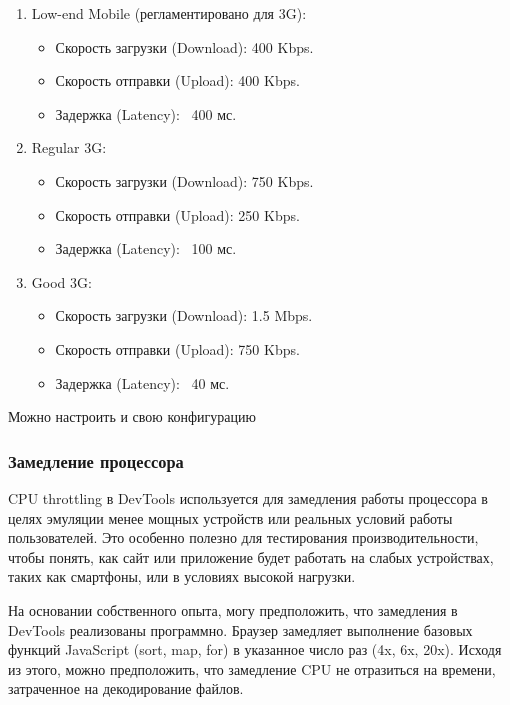 \documentclass[12pt]{article}
\begin{document}
\begin{enumerate}
    \item Low-end Mobile (регламентировано для 3G):

          \begin{itemize}[label=-]
              \item Скорость загрузки (Download): 400 Kbps.
              \item Скорость отправки (Upload): 400 Kbps.
              \item Задержка (Latency): ~400 мс.

          \end{itemize}
    \item Regular 3G:

          \begin{itemize}[label=-]
              \item Скорость загрузки (Download): 750 Kbps.
              \item Скорость отправки (Upload): 250 Kbps.
              \item Задержка (Latency): ~100 мс.

          \end{itemize}

    \item Good 3G:
          \begin{itemize}[label=-]
              \item Скорость загрузки (Download): 1.5 Mbps.
              \item Скорость отправки (Upload): 750 Kbps.
              \item Задержка (Latency): ~40 мс.
          \end{itemize}
\end{enumerate}

Можно настроить и свою конфигурацию

\subsubsection{Замедление процессора}

CPU throttling в DevTools используется для замедления работы процессора
в целях эмуляции менее мощных устройств или реальных условий работы пользователей.
Это особенно полезно для тестирования производительности, чтобы понять,
как сайт или приложение будет работать на слабых устройствах,
таких как смартфоны, или в условиях высокой нагрузки.

На основании собственного опыта, могу предположить, что замедления в DevTools
реализованы программно.
Браузер замедляет выполнение базовых функций JavaScript (sort, map, for) в указанное число раз (4x, 6x, 20x).
Исходя из этого, можно предположить, что замедление CPU не отразиться на времени,
затраченное на декодирование файлов.
\end{document}
